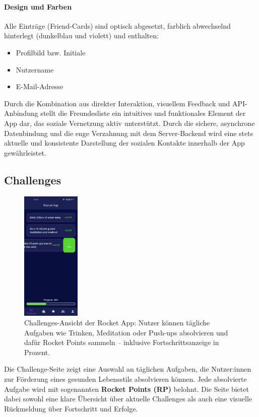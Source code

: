 \documentclass[11pt,a4paper]{article}
\begin{document}
\paragraph{Design und Farben}
Alle Einträge (Friend-Cards) sind optisch abgesetzt, farblich abwechselnd hinterlegt (dunkelblau und violett) und enthalten:
\begin{itemize}
    \item Profilbild bzw. Initiale
    \item Nutzername
    \item E-Mail-Adresse
\end{itemize}

Durch die Kombination aus direkter Interaktion, visuellem Feedback und API-Anbindung stellt die Freundesliste ein intuitives und funktionales Element der App dar, das soziale Vernetzung aktiv unterstützt. Durch die sichere, asynchrone Datenbindung und die enge Verzahnung mit dem Server-Backend wird eine stets aktuelle und konsistente Darstellung der sozialen Kontakte innerhalb der App gewährleistet.

\subsection{Challenges}

\begin{figure}[H]
    \centering
    \includegraphics[width=0.25\textwidth]{images/apps/challenge-page.jpg}
    \caption{Challenges-Ansicht der Rocket App: Nutzer können tägliche Aufgaben wie Trinken, Meditation oder Push-ups absolvieren und dafür Rocket Points sammeln – inklusive Fortschrittsanzeige in Prozent.}
    \label{fig:validation-workflow}
\end{figure}

Die Challenge-Seite zeigt eine Auswahl an täglichen Aufgaben, die Nutzer:innen zur Förderung eines gesunden Lebensstils absolvieren können. Jede absolvierte Aufgabe wird mit sogenannten \textbf{Rocket Points (RP)} belohnt. Die Seite bietet dabei sowohl eine klare Übersicht über aktuelle Challenges als auch eine visuelle Rückmeldung über Fortschritt und Erfolge.
\end{document}
